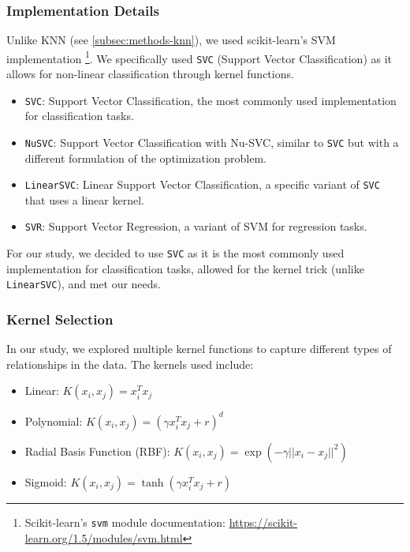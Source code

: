 \subsubsection{Implementation Details}

Unlike KNN (see \autoref{subsec:methods-knn}), we used scikit-learn's SVM implementation
\footnote{Scikit-learn's \texttt{svm} module documentation: \url{https://scikit-learn.org/1.5/modules/svm.html}}.
We specifically used \texttt{SVC} (Support Vector Classification) as it allows for non-linear classification through kernel functions.

\begin{itemize}
    \item \texttt{SVC}: Support Vector Classification, the most commonly used implementation for classification tasks.
    \item \texttt{NuSVC}: Support Vector Classification with Nu-SVC, similar to \texttt{SVC} but with a different formulation of the optimization problem.
    \item \texttt{LinearSVC}: Linear Support Vector Classification, a specific variant of \texttt{SVC} that uses a linear kernel.
    \item \texttt{SVR}: Support Vector Regression, a variant of SVM for regression tasks.
\end{itemize}

For our study, we decided to use \texttt{SVC} as it is the most commonly used implementation
for classification tasks, allowed for the kernel trick (unlike \texttt{LinearSVC}), and met our needs.

\subsubsection{Kernel Selection}

In our study, we explored multiple kernel functions to capture different types of relationships in the data. The kernels used include:

\begin{itemize}
    \item Linear: $K(x_i, x_j) = x_i^T x_j$
    \item Polynomial: $K(x_i, x_j) = (\gamma x_i^T x_j + r)^d$
    \item Radial Basis Function (RBF): $K(x_i, x_j) = \exp(-\gamma ||x_i - x_j||^2)$
    \item Sigmoid: $K(x_i, x_j) = \tanh(\gamma x_i^T x_j + r)$
\end{itemize}


